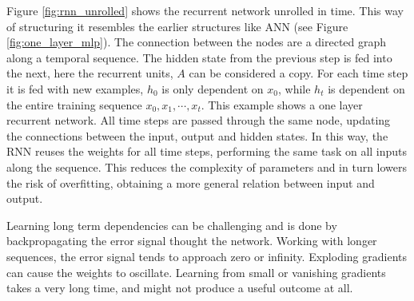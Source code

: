 
Figure \ref{fig:rnn_unrolled} shows the recurrent network unrolled in time. This way of structuring it resembles the earlier structures like ANN (see Figure \ref{fig:one_layer_mlp}). The connection between the nodes %
are a directed graph along a temporal sequence. The hidden state from the previous step is fed into the next, here the recurrent units, $A$ can be considered a copy. For each time step it is fed with new examples, $h_0$ is only dependent on $x_0$, while $h_t$ is dependent on the entire training sequence $x_0, x_1, \cdots, x_t $. This example shows a one layer recurrent network. All time steps are passed through the same node, updating the connections between the input, output and hidden states. In this way, the RNN reuses the weights for all time steps, performing the same task on all inputs along the sequence. This reduces the complexity of parameters and in turn lowers the risk of overfitting, obtaining a more general relation between input and output.

Learning long term dependencies can be challenging and is done by backpropagating the error signal thought the network. Working with longer sequences, the error signal tends to approach zero or infinity. Exploding gradients can cause the weights to oscillate. Learning from small or vanishing gradients takes a very long time, and might not produce a useful outcome at all. 

